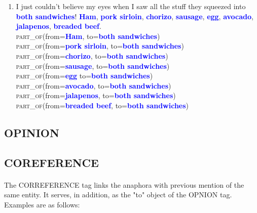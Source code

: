\documentclass{article}
\begin{document}
\begin{enumerate}[resume]
\item I just couldn't believe my eyes when I saw all the stuff they squeezed into \textbf{\textcolor{blue}{both sandwiches}}! \textbf{\textcolor{blue}{Ham}}, \textbf{\textcolor{blue}{pork sirloin}}, \textbf{\textcolor{blue}{chorizo}}, \textbf{\textcolor{blue}{sausage}}, \textbf{\textcolor{blue}{egg}}, \textbf{\textcolor{blue}{avocado}}, \textbf{\textcolor{blue}{jalapenos}}, \textbf{\textcolor{blue}{breaded beef}}.\\
\textsc{part\_of}(from=\textbf{\textcolor{blue}{Ham}}, to=\textbf{\textcolor{blue}{both sandwiches}}) \\
\textsc{part\_of}(from=\textbf{\textcolor{blue}{pork sirloin}}, to=\textbf{\textcolor{blue}{both sandwiches}}) \\
\textsc{part\_of}(from=\textbf{\textcolor{blue}{chorizo}}, to=\textbf{\textcolor{blue}{both sandwiches}}) \\
\textsc{part\_of}(from=\textbf{\textcolor{blue}{sausage}}, to=\textbf{\textcolor{blue}{both sandwiches}}) \\
\textsc{part\_of}(from=\textbf{\textcolor{blue}{egg}} to=\textbf{\textcolor{blue}{both sandwiches}}) \\
\textsc{part\_of}(from=\textbf{\textcolor{blue}{avocado}}, to=\textbf{\textcolor{blue}{both sandwiches}}) \\
\textsc{part\_of}(from=\textbf{\textcolor{blue}{jalapenos}}, to=\textbf{\textcolor{blue}{both sandwiches}}) \\
\textsc{part\_of}(from=\textbf{\textcolor{blue}{breaded beef}}, to=\textbf{\textcolor{blue}{both sandwiches}}) \\
\end{enumerate}

\subsection{OPINION}
\paragraph{}

\subsection{COREFERENCE}
\paragraph{}
The CORREFERENCE tag links the anaphora with previous mention of the same entity. It serves, in addition, as the "to" object of the OPNION tag. Examples are as follows:
\end{document}
